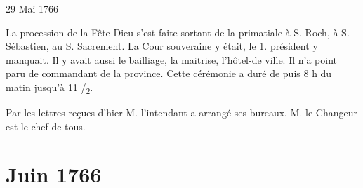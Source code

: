                      \begin{diary}{29 Mai 1766}{}
                        
                         La procession de la Fête-Dieu s'est
                           faite
                           sortant de la
                              primatiale à S.
                              Roch, à S.
                              Sébastien, au S. Sacrement. La Cour souveraine
                           y était, le 1. président y manquait. Il y
                           avait aussi le bailliage,
                              la maitrise,
                           l'hôtel-de ville. Il n'a point paru
                           de
                           commandant de la province. Cette cérémonie
                           a duré de puis 8 h du matin jusqu'à 11 /\textsubscript{2}. \bigskip
        
        
                         Par les lettres reçues d'hier M. l'intendant
                           a arrangé ses bureaux. M. le
                              Changeur est
                           le chef de tous. \bigskip
        
        
                     \end{diary}
                  \chapter*{Juin 1766}
                     
